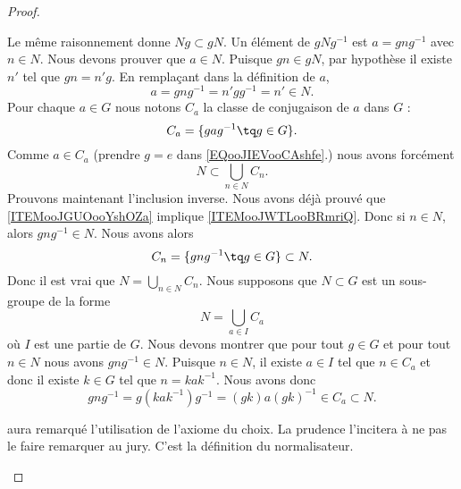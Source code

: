 \begin{proof}
\begin{subproof}
		Le même raisonnement donne \( Ng\subset gN\).
		Un élément de \( g Ng^{-1}\) est \( a=gng^{-1}\) avec \( n\in N\). Nous devons prouver que \( a\in N\). Puisque \( gn\in gN\), par hypothèse il existe \( n'\) tel que \( gn=n'g\). En remplaçant dans la définition de \( a\),
		\begin{equation}
			a=gng^{-1}=n'gg^{-1}=n'\in N.
		\end{equation}
		Pour chaque \( a\in G\) nous notons \( C_a\) la classe de conjugaison de \( a\) dans \( G\) :
		\begin{equation}        \label{EQooJIEVooCAshfe}
			C_a=\{ gag^{-1}\tq g\in G \}.
		\end{equation}
		Comme \( a\in C_a\) (prendre \( g=e\) dans \eqref{EQooJIEVooCAshfe}.) nous avons forcément
		\begin{equation}
			N\subset\bigcup_{n\in N}C_n.
		\end{equation}
		Prouvons maintenant l'inclusion inverse. Nous avons déjà prouvé que \ref{ITEMooJGUOooYshOZa} implique \ref{ITEMooJWTLooBRmriQ}. Donc si \( n\in N\), alors \( gng^{-1}\in N\). Nous avons alors
		\begin{equation}
			C_n=\{ gng^{-1}\tq g\in G \}\subset N.
		\end{equation}
		Donc il est vrai que \( N=\bigcup_{n\in N}C_n\).
		Nous supposons que \( N\subset G\) est un sous-groupe de la forme
		\begin{equation}
			N=\bigcup_{a\in I}C_a
		\end{equation}
		où \( I\) est une partie de \( G\). Nous devons montrer que pour tout \( g\in G\) et pour tout \( n\in N\) nous avons \( gng^{-1}\in N\). Puisque \( n\in N\), il existe \( a\in I\) tel que \( n\in C_a\) et donc il existe \( k\in G\) tel que \( n=kak^{-1}\). Nous avons donc
		\begin{equation}
			gng^{-1}=g(kak^{-1})g^{-1}=(gk)a(gk)^{-1}\in C_a\subset N.
		\end{equation}

		 aura remarqué l'utilisation de l'axiome du choix. La prudence l'incitera à ne pas le faire remarquer au jury.
		C'est la définition du normalisateur.
	\end{subproof}
\end{proof}

